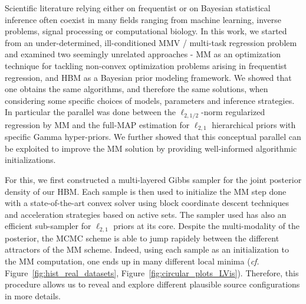 Scientific literature relying either on frequentist or on Bayesian statistical inference often coexist in many fields ranging from machine learning, inverse problems, signal processing or computational biology.
In this work, we started from an under-determined, ill-conditioned MMV / multi-task regression problem and examined two seemingly unrelated approaches - MM as an optimization technique for tackling non-convex optimization problems arising in frequentist regression, and HBM as a Bayesian prior modeling framework. We showed that one obtains the same algorithms, and therefore the same solutions, when considering some specific choices of models, parameters and inference strategies. In particular the parallel was done between the $\ell_{2,1/2}$-norm regularized regression by MM and the full-MAP estimation for $\ell_{2,1}$ hierarchical priors with specific Gamma hyper-priors. We further showed that this conceptual parallel can be exploited to improve the MM solution by providing well-informed algorithmic initializations.



For this, we first constructed a multi-layered Gibbs sampler for the joint posterior density of our HBM.
Each sample is then used to initialize the MM step done with a state-of-the-art convex solver using block coordinate
descent techniques and acceleration strategies based on active sets. The sampler used has also an efficient sub-sampler for $\ell_{2,1}$ priors at its core. Despite the multi-modality of the posterior, the MCMC scheme is able to jump rapidely between the different attractors of the MM scheme. Indeed, using each sample as an initialization to the MM computation, one ends up in many different local minima (\textit{cf.} Figure~\ref{fig:hist_real_datasets}, Figure~\ref{fig:circular_plots_LVis}). 
Therefore, this procedure allows us to reveal and explore different plausible source configurations in more details.
% 

